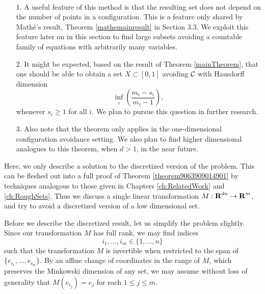 \begin{remarks}
    \
    \begin{enumerate}
        \item[1.] A useful feature of this method is that the resulting set does not depend on the number of points in a configuration. This is a feature only shared by Math\'{e}'s result, Theorem \ref{mathemainresult} in Section 3.3. We exploit this feature later on in this section to find large subsets avoiding a countable family of equations with arbitrarily many variables.

        \item[2.] It might be expected, based on the result of Theorem \ref{mainTheorem}, that one should be able to obtain a set $X \subset [0,1]$ avoiding $\operatorname{\mathcal{C}}$ with Hausdorff dimension
        \[ \inf_i \left( \frac{m_i - s_i}{m_i - 1} \right), \]
        whenever $s_i \geq 1$ for all $i$. We plan to pursue this question in further research.

        \item[3.] Also note that the theorem only applies in the one-dimensional configuration avoidance setting. We also plan to find higher dimensional analogues to this theorem, when $d > 1$, in the near future.
    \end{enumerate}
\end{remarks}

Here, we only describe a solution to the discretized version of the problem. This can be fleshed out into a full proof of Theorem \ref{theorem9063909014901} by techniques analogous to those given in Chapters \ref{ch:RelatedWork} and \ref{ch:RoughSets}. Thus we discuss a single linear transformation $M: \operatorname{\mathbf{R}}^{dn} \to \operatorname{\mathbf{R}}^m$, and try to avoid a discretized version of a low dimensional set.

Before we describe the discretized result, let us simplify the problem slightly. Since our transformation $M$ has full rank, we may find indices
%
\[ i_1, \dots, i_m \in \{ 1, \dots, n \} \]
%
such that the transformation $M$ is invertible when restricted to the span of $\{ e_{i_1}, \dots, e_{i_m} \}$. By an affine change of coordinates in the range of $M$, which preserves the Minkowski dimension of any set, we may assume without loss of generality that $M(e_{i_j}) = e_j$ for each $1 \leq j \leq m$.

